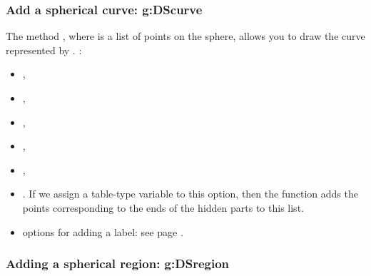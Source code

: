 \subsubsection{Add a spherical curve: g:DScurve}

The method , where  is a list of points on the sphere, allows you to draw the curve represented by . \writeoptions:
\begin{itemize}
    \item {},
    \item {},
    \item {},
    \item {},
    \item {},
    \item {}. If we assign a table-type variable to this  option, then the function adds the points corresponding to the ends of the hidden parts to this list.
    \item options for adding a label: see page \pageref{addlabel}.
\end{itemize}

\subsubsection{Adding a spherical region: g:DSregion}

